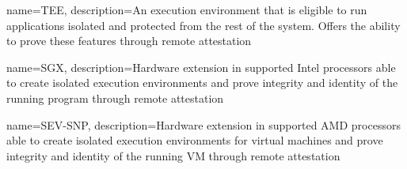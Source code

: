 {
    name=TEE,
    description={An execution environment that is eligible to run applications isolated and protected from the rest of
            the system. Offers the ability to prove these features through remote attestation}
}

{
    name=SGX,
    description={Hardware extension in supported Intel processors able to create isolated execution environments and
            prove integrity and identity of the running program through remote attestation}
}

{
    name=SEV-SNP,
    description={Hardware extension in supported AMD processors able to create isolated execution environments for
            virtual machines and prove integrity and identity of the running VM through remote attestation}
}
